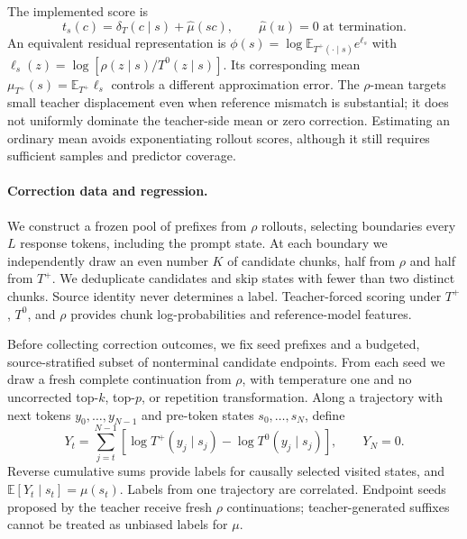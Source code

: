 \documentclass[pdflatex,sn-mathphys-num,review]{sn-jnl}
\theoremstyle{thmstyleone}
\theoremstyle{thmstyletwo}
\theoremstyle{thmstylethree}
\providecommand{\Tp}{T^{+}}
\providecommand{\Tz}{T^{0}}
\providecommand{\E}{\mathbb{E}}
\providecommand{\muhat}{\widehat{\mu}}
\begin{document}
The implemented score is
\begin{equation}
t_s(c)=\delta_T(c\mid s)+\muhat(sc),\qquad \muhat(u)=0\text{ at termination}.
\label{eq:score}
\end{equation}
An equivalent residual representation is $\phi(s)=\log\E_{\Tp(\cdot\mid s)}e^{\ell_s}$ with $\ell_s(z)=\log[\rho(z\mid s)/\Tz(z\mid s)]$. Its corresponding mean $\mu_{\Tp}(s)=\E_{\Tp}\ell_s$ controls a different approximation error. The $\rho$-mean targets small teacher displacement even when reference mismatch is substantial; it does not uniformly dominate the teacher-side mean or zero correction. Estimating an ordinary mean avoids exponentiating rollout scores, although it still requires sufficient samples and predictor coverage.

\paragraph{Correction data and regression.}
We construct a frozen pool of prefixes from $\rho$ rollouts, selecting boundaries every $L$ response tokens, including the prompt state. At each boundary we independently draw an even number $K$ of candidate chunks, half from $\rho$ and half from $\Tp$. We deduplicate candidates and skip states with fewer than two distinct chunks. Source identity never determines a label. Teacher-forced scoring under $\Tp$, $\Tz$, and $\rho$ provides chunk log-probabilities and reference-model features.

Before collecting correction outcomes, we fix seed prefixes and a budgeted, source-stratified subset of nonterminal candidate endpoints. From each seed we draw a fresh complete continuation from $\rho$, with temperature one and no uncorrected top-$k$, top-$p$, or repetition transformation. Along a trajectory with next tokens $y_0,\ldots,y_{N-1}$ and pre-token states $s_0,\ldots,s_N$, define
\begin{equation}
Y_t=\sum_{j=t}^{N-1}\left[\log\Tp(y_j\mid s_j)-\log\Tz(y_j\mid s_j)\right],\qquad Y_N=0.
\label{eq:labels}
\end{equation}
Reverse cumulative sums provide labels for causally selected visited states, and $\E[Y_t\mid s_t]=\mu(s_t)$. Labels from one trajectory are correlated. Endpoint seeds proposed by the teacher receive fresh $\rho$ continuations; teacher-generated suffixes cannot be treated as unbiased labels for $\mu$.
\end{document}
